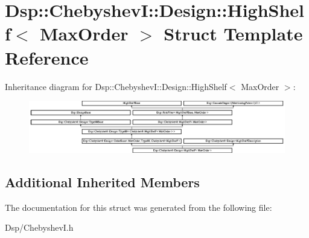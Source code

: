 \hypertarget{structDsp_1_1ChebyshevI_1_1Design_1_1HighShelf}{\section{Dsp\-:\-:Chebyshev\-I\-:\-:Design\-:\-:High\-Shelf$<$ Max\-Order $>$ Struct Template Reference}
\label{structDsp_1_1ChebyshevI_1_1Design_1_1HighShelf}
}
Inheritance diagram for Dsp\-:\-:Chebyshev\-I\-:\-:Design\-:\-:High\-Shelf$<$ Max\-Order $>$\-:\begin{figure}[H]
\begin{center}
\leavevmode
\includegraphics[height=2.271805cm]{structDsp_1_1ChebyshevI_1_1Design_1_1HighShelf}
\end{center}
\end{figure}
\subsection*{Additional Inherited Members}


The documentation for this struct was generated from the following file\-:\begin{DoxyCompactItemize}
\item 
Dsp/Chebyshev\-I.\-h\end{DoxyCompactItemize}
